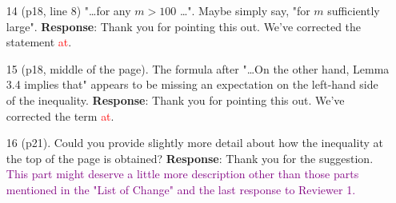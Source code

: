 \documentclass[11pt,a4paper]{article}
\numberwithin{equation}{section}
\newcommand{\edt}[1]{\textcolor{purple}{#1}} %
\def\TBF#1{\textcolor{red}{#1}} %
\begin{document}
\begin{itemize}
		
		\item [14] (p18, line 8) "\dots for any $m > 100$ \dots ". Maybe simply say, "for $m$ sufficiently large".
		\subitem \textbf{Response}:  Thank you for pointing this out.  We've corrected the statement \TBF{at}.
		
		
		
		\item [15] (p18, middle of the page). The formula after "\dots On the other hand, Lemma 3.4 implies that" appears to be missing an expectation on the left-hand side of the inequality.
		\subitem \textbf{Response}:  Thank you for pointing this out. We've corrected the term \TBF{at}.
		
		\item [16] (p21). Could you provide slightly more detail about how the inequality at the top of the page is obtained?
		\subitem \textbf{Response}: Thank you for the suggestion. \edt{This part might deserve a little more description other than those parts mentioned in the "List of Change" and the last response to Reviewer 1.}
		
		
	\end{itemize}
\end{document}
